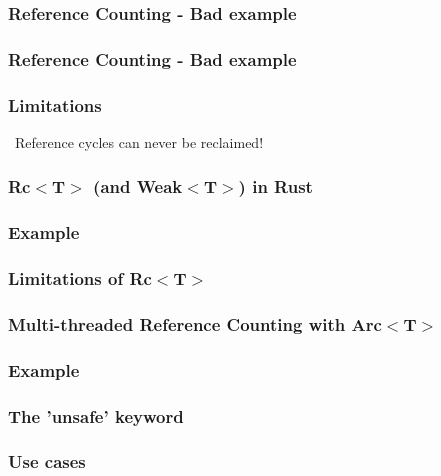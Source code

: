 \documentclass{beamer}
\newcommand{\attention}{{\scalebox{.75}{\bf}}\ }
\begin{document}
\begin{frame}
	\frametitle{Reference Counting - Bad example}
	\begin{figure}
		\def\svgwidth{230pt}
		\huge
		
	\end{figure}
\end{frame}
\begin{frame}
	\frametitle{Reference Counting - Bad example}
	\begin{figure}
		\def\svgwidth{230pt}
		\huge
		
	\end{figure}
\end{frame}
\begin{frame}
	\frametitle{Limitations}
	\attention Reference cycles can never be reclaimed!
\end{frame}
\begin{frame}
	\frametitle{Rc$<$T$>$ (and Weak$<$T$>$) in Rust}
\end{frame}
\begin{frame}
	\frametitle{Example}
\end{frame}
\begin{frame}
	\frametitle{Limitations of Rc$<$T$>$}
\end{frame}
\begin{frame}
	\frametitle{Multi-threaded Reference Counting with Arc$<$T$>$}
\end{frame}
\begin{frame}
	\frametitle{Example}
\end{frame}
\begin{frame}
	\frametitle{The 'unsafe' keyword}
\end{frame}
\begin{frame}
	\frametitle{Use cases}
\end{frame}
\end{document}
